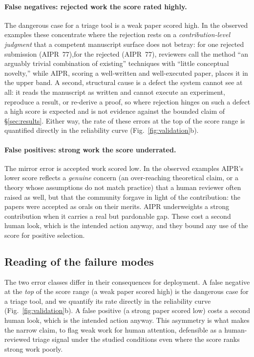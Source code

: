 \paragraph{False negatives: rejected work the score rated highly.}
The dangerous case for a triage tool is a weak paper scored high. In the observed
examples these concentrate where the rejection rests on a \emph{contribution-level
judgment} that a competent manuscript surface does not betray:
\ifanonymous for one rejected submission (AIPR~77),\else for the rejected
\citet{reactivesynth2026} (AIPR~77),\fi{} reviewers call the method ``an arguably
trivial combination of existing'' techniques with ``little conceptual novelty,''
while AIPR, scoring a well-written and well-executed paper, places it in the upper
band. A second, structural cause is a defect the system cannot see at all: it reads
the manuscript as written and cannot execute an experiment, reproduce a result, or
re-derive a proof, so where rejection hinges on such a defect a high score is expected
and is not evidence against the bounded claim of \S\ref{sec:results}. Either way, the rate of these errors at the top of the score
range is quantified directly in the reliability curve (Fig.~\ref{fig:validation}b).

\paragraph{False positives: strong work the score underrated.}
The mirror error is accepted work scored low. In the observed examples AIPR's lower
score reflects a \emph{genuine} concern (an over-reaching theoretical claim, or a
theory whose assumptions do not match practice) that a human reviewer often raised
as well, but that the community forgave in light of the contribution: the papers
were accepted as orals on their merits. AIPR underweights a strong contribution when
it carries a real but pardonable gap. These cost a second human look, which is the
intended action anyway, and they bound any use of the score for positive selection.

\subsection{Reading of the failure modes}
The two error classes differ in their consequences for deployment. A false
negative at the \emph{top} of the score range (a weak paper scored high) is the
dangerous case for a triage tool, and we quantify its rate directly in the
reliability curve (Fig.~\ref{fig:validation}b). A false positive (a strong paper
scored low) costs a second human look, which is the intended action anyway. This
asymmetry is what makes the narrow claim, to flag weak work for human attention,
defensible as a human-reviewed triage signal under the studied conditions even
where the score ranks strong work poorly.
